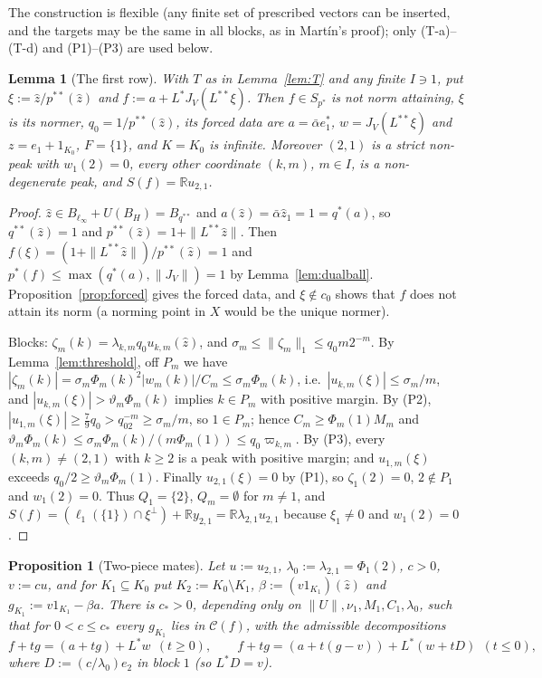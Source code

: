 \documentclass[10pt]{amsart}
\newtheorem{lemma}[theorem]{Lemma}
\newtheorem{proposition}[theorem]{Proposition}
\theoremstyle{definition}
\theoremstyle{remark}
\newcommand{\R}{\mathbb R}
\newcommand{\Cset}{\mathcal C}
\newcommand{\zh}{\hat z}
\begin{document}
The construction is flexible (any finite set of prescribed vectors can be
inserted, and the targets may be the same in all blocks, as in Mart\'in's
proof); only (T-a)--(T-d) and (P1)--(P3) are used below.

\begin{lemma}[The first row]\label{lem:firstrow}
With $T$ as in Lemma~\ref{lem:T} and any finite $I\ni1$, put
$\xi:=\zh/p^{**}(\zh)$ and $f:=a+L^*J_V(L^{**}\xi)$.  Then $f\in S_{p^*}$ is
not norm attaining, $\xi$ is its normer, $q_0=1/p^{**}(\zh)$, its forced data
are $a=\bar\alpha e_1^*$, $w=J_V(L^{**}\xi)$ and $z=e_1+1_{K_0}$, $F=\{1\}$, and
$K=K_0$ is infinite.  Moreover $(2,1)$ is a strict non-peak with $w_1(2)=0$,
every other coordinate $(k,m)$, $m\in I$, is a non-degenerate peak, and
$S(f)=\R u_{2,1}$.
\end{lemma}

\begin{proof}
$\zh\in B_{\ell_\infty}+U(B_H)=B_{q^{**}}$ and $a(\zh)=\bar\alpha\zh_1=1=q^*(a)$,
so $q^{**}(\zh)=1$ and $p^{**}(\zh)=1+\|L^{**}\zh\|$.  Then
$f(\xi)=(1+\|L^{**}\zh\|)/p^{**}(\zh)=1$ and $p^*(f)\le\max(q^*(a),\|J_V\|)
=1$ by Lemma~\ref{lem:dualball}.  Proposition~\ref{prop:forced} gives the
forced data, and $\xi\notin c_0$ shows that $f$ does not attain its norm
(a norming point in $X$ would be the unique normer).

Blocks: $\zeta_m(k)=\lambda_{k,m}q_0u_{k,m}(\zh)$, and
$\sigma_m\le\|\zeta_m\|_1\le q_0m2^{-m}$.  By Lemma~\ref{lem:threshold},
off $P_m$ we have $|\zeta_m(k)|=\sigma_m\Phi_m(k)^2|w_m(k)|/C_m\le\sigma_m
\Phi_m(k)$, i.e.\ $|u_{k,m}(\xi)|\le\sigma_m/m$, and
$|u_{k,m}(\xi)|>\vartheta_m\Phi_m(k)$ implies $k\in P_m$ with positive
margin.  By (P2), $|u_{1,m}(\xi)|\ge\frac79q_0>q_02^{-m}\ge\sigma_m/m$, so
$1\in P_m$; hence $C_m\ge\Phi_m(1)M_m$ and
$\vartheta_m\Phi_m(k)\le\sigma_m\Phi_m(k)/(m\Phi_m(1))\le q_0\varpi_{k,m}$.  By
(P3), every $(k,m)\ne(2,1)$ with $k\ge2$ is a peak with positive margin; and
$u_{1,m}(\xi)$ exceeds $q_0/2\ge\vartheta_m\Phi_m(1)$.  Finally
$u_{2,1}(\xi)=0$ by (P1), so $\zeta_1(2)=0$, $2\notin P_1$ and
$w_1(2)=0$.  Thus $Q_1=\{2\}$, $Q_m=\emptyset$ for $m\ne1$, and
$S(f)=(\ell_1(\{1\})\cap\xi^\perp)+\R y_{2,1}=\R\lambda_{2,1}u_{2,1}$
because $\xi_1\ne0$ and $w_1(2)=0$.
\end{proof}

\begin{proposition}[Two-piece mates]\label{prop:twopiece}
Let $u:=u_{2,1}$, $\lambda_0:=\lambda_{2,1}=\Phi_1(2)$, $c>0$, $v:=cu$, and for
$K_1\subseteq K_0$ put $K_2:=K_0\setminus K_1$,
$\beta:=(v1_{K_1})(\zh)$ and $g_{K_1}:=v1_{K_1}-\beta a$.  There is $c_*>0$,
depending only on $\|U\|,\nu_1,M_1,C_1,\lambda_0$, such that for $0<c\le c_*$
every $g_{K_1}$ lies in $\Cset(f)$, with the admissible decompositions
\[
 f+tg=(a+tg)+L^*w\ \ (t\ge0),\qquad
 f+tg=(a+t(g-v))+L^*(w+tD)\ \ (t\le0),
\]
where $D:=(c/\lambda_0)e_2$ in block $1$ \textup{(}so $L^*D=v$\textup{)}.
\end{proposition}
\end{document}
